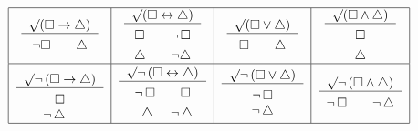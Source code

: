 \documentclass[letterpaper, 11pt]{article}
\theoremstyle{definition}
\begin{document}
\[\begin{tabular}{|c|c|c|c|}
\hline
\begin{tabular}{c}
$\surd (\square\to\triangle)$\\ \hline
$\rule{0pt}{12pt}\neg\square \quad\quad \triangle$
\end{tabular}
&
\begin{tabular}{c}
$\surd (\square\leftrightarrow\triangle)$\\ \hline
$\rule{0pt}{12pt}\square \quad\quad  \neg\,\square$\\
$\rule{0pt}{12pt}\triangle \quad\quad  \neg\triangle$
\end{tabular}
&
\begin{tabular}{c}
$\surd (\square\vee\triangle)$\\ \hline
$\rule{0pt}{12pt}\square \quad\quad \triangle$
\end{tabular}
&
\begin{tabular}{c}
$\surd (\square\wedge\triangle)$\\ \hline
$\rule{0pt}{12pt}\square$\\
$\rule{0pt}{12pt}\triangle$\\
\end{tabular}
\\\hline %
\begin{tabular}{c}
\rule{0pt}{15pt}$\surd \neg\,(\square\to\triangle)$\\ \hline
$\rule{0pt}{12pt}\square$\\
$\hspace{-9pt}\neg\,\triangle$
\end{tabular}
&
\begin{tabular}{c}
$\surd \neg\,(\square\leftrightarrow\triangle)$\\ \hline
$\rule{0pt}{12pt}\neg\,\square \quad\quad \square$\\
$\rule{0pt}{12pt}\hspace{7pt}\triangle \hspace{14pt} \neg\,\triangle$\\
\end{tabular}
&
\begin{tabular}{c}
$\surd \neg\,(\square\vee\triangle)$\\ \hline
$\rule{0pt}{12pt}\neg\,\square$\\$\neg\,\triangle$
\end{tabular}
&
\begin{tabular}{c}
$\surd \neg\,(\square\wedge\triangle)$\\ \hline
$\rule{0pt}{12pt}\neg\,\square \quad\quad\neg\,\triangle$\\
\end{tabular}\\\hline
\end{tabular}\]
\end{document}
